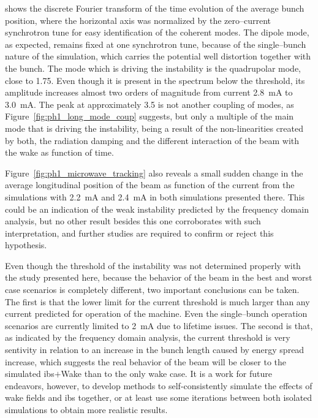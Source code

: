     shows the discrete Fourier transform of the time evolution of the average bunch position, where the horizontal axis was normalized by the zero--current synchrotron tune for easy identification of the coherent modes. The dipole mode, as expected, remains fixed at one synchrotron tune, because of the single--bunch nature of the simulation, which carries the potential well distortion together with the bunch.
    The mode which is driving the instability is the quadrupolar mode, close to \num{1.75}. Even though it is present in the spectrum below the threshold, its amplitude increases almost two orders of magnitude from current \SI{2.8}{\milli\ampere} to \SI{3.0}{\milli\ampere}. The peak at approximately \num{3.5} is not another coupling of modes, as Figure~\ref{fig:ph1_long_mode_coup} suggests, but only a multiple of the main mode that is driving the instability, being a result of the non-linearities created by both, the radiation damping and the different interaction of the beam with the wake as function of time.

    Figure~\ref{fig:ph1_microwave_tracking} also reveals a small sudden change in the average longitudinal position of the beam as function of the current from the simulations with \SI{2.2}{\milli\ampere} and \SI{2.4}{\milli\ampere} in both simulations presented there. This could be an indication of the weak instability predicted by the frequency domain analysis, but no other result besides this one corroborates with such interpretation, and further studies are required to confirm or reject this hypothesis.

    Even though the threshold of the instability was not determined properly with the study presented here, because the behavior of the beam in the best and worst case scenarios is completely different, two important conclusions can be taken. The first is that the lower limit for the current threshold is much larger than any current predicted for operation of the machine. Even the single--bunch operation scenarios are currently limited to \SI{2}{\milli\ampere} due to lifetime issues. The second is that, as indicated by the frequency domain analysis, the current threshold is very sentivity in relation to an increase in the bunch length caused by energy spread increase, which suggests the real behavior of the beam will be closer to the simulated \gls{ibs}$+$Wake than to the only wake case. It is a work for future endeavors, however, to develop methods to self-consistently simulate the effects of wake fields and \gls{ibs} together, or at least use some iterations between both isolated simulations to obtain more realistic results.

